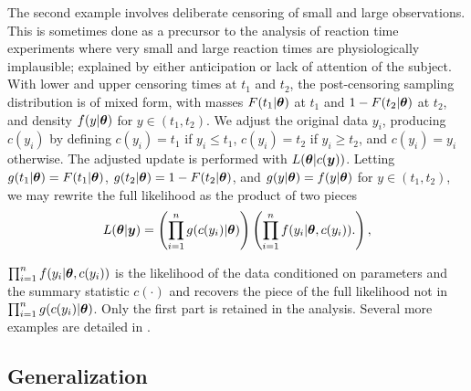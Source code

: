 \documentclass[ba]{imsart}
\def\bth{\mbox{\boldmath $\theta$}}
\newcommand{\by}{\mbox{\boldmath $y$}}
\begin{document}
The second example involves deliberate censoring of small and large observations. This is
sometimes done as a precursor to the analysis of reaction time experiments  \citep[e.g.,][]{ratcliff1993} where very small and large reaction times are physiologically implausible;  explained by either anticipation or lack of attention of the subject.  
With lower and upper censoring times at $t_1$ and $t_2$, the post-censoring sampling distribution is of mixed form, with masses $F(t_1|\bth)$ at $t_1$ and $1-F(t_2|\bth)$ at $t_2$,
and density $f(y | \bth)$ for $y \in (t_1, t_2)$.  We adjust the original data $y_i$,
producing $c(y_i)$ by defining $c(y_i)= t_1$ if $y_i \leq t_1$, $c(y_i)=t_2$ 
if $y_i \geq t_2$, and $c(y_i)=y_i$ otherwise.  
The adjusted update is performed with $L(\bth |c(\by))$.  
Letting $g(t_1|\bth) = F(t_1|\bth)$,
$g(t_2 | \bth) = 1 - F(t_2|\bth)$, and $g(y|\bth)=f(y|\bth)$ for
$y \in (t_1, t_2)$, we may rewrite the full 
likelihood as the product of two pieces
\begin{eqnarray}
\label{Censoring} 
L(\bth  | \by) =  \left( \prod_{i=1}^n g(c(y_i)  | \bth) \right) \left( \prod_{i=1}^n f(y_i|\bth,c(y_i)). \right) ,  
\end{eqnarray}

$\prod_{i=1}^n f(y_i|\bth,c(y_i))$ is the likelihood of the data conditioned on parameters and the summary statistic $c(\cdot)$ and recovers the piece of the full likelihood not in $ \prod_{i=1}^n g(c(y_i)  | \bth)$. Only the first part is retained in the analysis. Several more examples are detailed in \cite{lewis2014}.



\subsection{Generalization}
\end{document}

